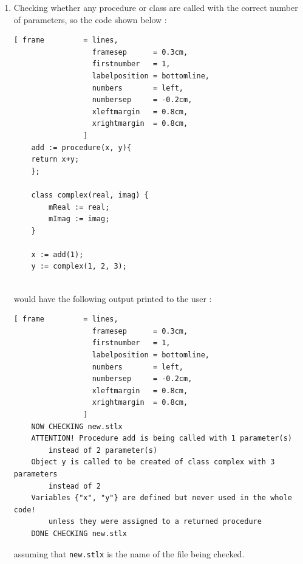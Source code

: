 \documentclass[11pt]{report}
\begin{document}
\begin{enumerate}
\item Checking whether any procedure or class are called with the correct number of parameters, so the code shown below : 
\begin{Verbatim}[ frame         = lines, 
                  framesep      = 0.3cm, 
                  firstnumber   = 1,
                  labelposition = bottomline,
                  numbers       = left,
                  numbersep     = -0.2cm,
                  xleftmargin   = 0.8cm,
                  xrightmargin  = 0.8cm,
                ]
    add := procedure(x, y){
    return x+y;
    };

    class complex(real, imag) {
        mReal := real;
        mImag := imag;
    }

    x := add(1);
    y := complex(1, 2, 3);
    
\end{Verbatim}
would have the following output printed to the user :
\pagebreak
\begin{Verbatim}[ frame         = lines, 
                  framesep      = 0.3cm, 
                  firstnumber   = 1,
                  labelposition = bottomline,
                  numbers       = left,
                  numbersep     = -0.2cm,
                  xleftmargin   = 0.8cm,
                  xrightmargin  = 0.8cm,
                ]
    NOW CHECKING new.stlx
    ATTENTION! Procedure add is being called with 1 parameter(s) 
        instead of 2 parameter(s)
    Object y is called to be created of class complex with 3 parameters
        instead of 2
    Variables {"x", "y"} are defined but never used in the whole code!
        unless they were assigned to a returned procedure
    DONE CHECKING new.stlx
\end{Verbatim}
assuming that \texttt{new.stlx} is the name of the file being checked.


\end{enumerate}
\end{document}
